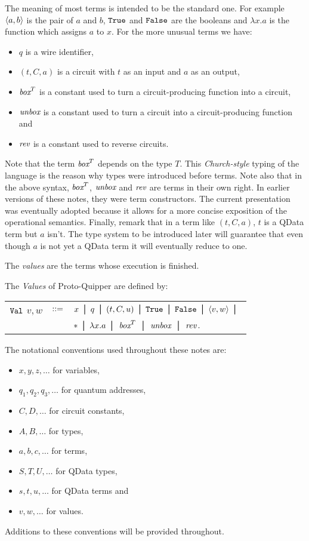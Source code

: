 \documentclass[twoside]{article}
\begin{document}
The meaning of most terms is intended to be the standard 
one. For example $\langle a,b\rangle$ is the pair of $a$ and $b$, 
$\texttt{True}$ and $\texttt{False}$ are the booleans and $\lambda x.a$ 
is the function which assigns $a$ to $x$. For the more 
unusual terms we have:
\begin{itemize}
  \item $q$ is a wire identifier,
  \item $(t,C,a)$ is a circuit with $t$ as an input and $a$ as an 
        output,
  \item $\mathop{\textit{box}}\nolimits^T$ is a constant used to turn a circuit-producing 
        function into a circuit,
  \item $\mathop{\textit{unbox}}\nolimits$ is a constant used to turn a circuit into a 
        circuit-producing function and
  \item $\mathop{\textit{rev}}\nolimits$ is a constant used to reverse circuits.
\end{itemize}
Note that the term $\mathop{\textit{box}}\nolimits^T$ depends on the type $T$. This 
\emph{Church-style} typing of the language is the reason why types 
were introduced before terms. Note also that in the above syntax, 
$\mathop{\textit{box}}\nolimits^T$, $\mathop{\textit{unbox}}\nolimits$ and $\mathop{\textit{rev}}\nolimits$ are terms in their own right. In earlier 
versions of these notes, they were term constructors. The current 
presentation was eventually adopted because it allows for a more 
concise exposition of the operational semantics. Finally, remark 
that in a term like $(t,C,a)$, $t$ is a QData term but $a$ isn't. 
The type system to be introduced later will guarantee that even 
though $a$ is not yet a QData term it will eventually reduce to 
one. 

The \emph{values} are the terms whose execution is finished.

\begin{definition}
The \emph{Values} of Proto-Quipper are defined by:
\begin{center}
\begin{tabular}{rcl}
$\texttt{Val}$ $v,w$ & $::=$ & $x \bor q \bor (t,C,u) \bor \true \bor 
  \false \bor \p{v,w} \bor$ \\
& & $* \bor \lambda x.a  \bor \boxx^T \bor \unbox \bor \rev.$
\end{tabular}
\end{center}
\end{definition}

The notational conventions used throughout these notes are:
\begin{itemize}
  \item $x,y,z,\ldots$ for variables,
  \item $q_1,q_2,q_3,\ldots$ for quantum addresses,
  \item $C,D,\ldots$ for circuit constants,
  \item $A,B,\ldots$ for types,
  \item $a,b,c,\ldots$ for terms,
  \item $S,T,U,\ldots$ for QData types,
  \item $s,t,u,\ldots$ for QData terms and
  \item $v,w,\ldots$ for values.
\end{itemize}
Additions to these conventions will be provided throughout.
\end{document}
